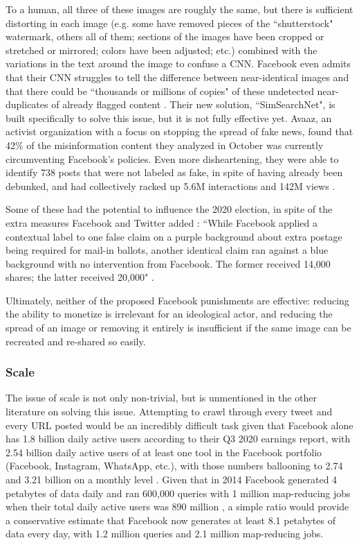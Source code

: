 \documentclass[preprint,review,12pt]{elsarticle}
\begin{document}
To a human, all three of these images are roughly the same, but there is sufficient distorting in each image (e.g. some have removed pieces of the ``shutterstock" watermark, others all of them; sections of the images have been cropped or stretched or mirrored; colors have been adjusted; etc.) combined with the variations in the text around the image to confuse a CNN. Facebook even admits that their CNN struggles to tell the difference between near-identical images and that there could be ``thousands or millions of copies" of these undetected near-duplicates of already flagged content \cite{sumbaly2020using}. Their new solution, ``SimSearchNet", is built specifically to solve this issue, but it is not fully effective yet. Avaaz, an activist organization with a focus on stopping the spread of fake news, found that 42\% of the misinformation content they analyzed in October was currently circumventing Facebook's policies. Even more disheartening, they were able to identify 738 posts that were not labeled as fake, in spite of having already been debunked, and had collectively racked up 5.6M interactions and 142M views \cite{schott2020brief}.

Some of these had the potential to influence the 2020 election, in spite of the extra measures Facebook and Twitter added \cite{dean2020facebook}: ``While Facebook applied a contextual label to one false claim on a purple background about extra postage being required for mail-in ballots, another identical claim ran against a blue background with no intervention from Facebook. The former received 14,000 shares; the latter received 20,000" \cite{Fung2020facebook}.

Ultimately, neither of the proposed Facebook punishments are effective: reducing the ability to monetize is irrelevant for an ideological actor, and reducing the spread of an image or removing it entirely is insufficient if the same image can be recreated and re-shared so easily.

\subsubsection{Scale}
\label{Scale Section}
The issue of scale is not only non-trivial, but is unmentioned in the other literature on solving this issue. Attempting to crawl through every tweet and every URL posted would be an incredibly difficult task given that Facebook alone has 1.8 billion daily active users according to their Q3 2020 earnings report, with 2.54 billion daily active users of at least one tool in the Facebook portfolio (Facebook, Instagram, WhatsApp, etc.), with those numbers ballooning to 2.74 and 3.21 billion on a monthly level \cite{facebook2020q3}. Given that in 2014 Facebook generated 4 petabytes of data daily and ran 600,000 queries with 1 million map-reducing jobs when their total daily active users was 890 million \cite{bronson2015open}, a simple ratio would provide a conservative estimate that Facebook now generates at least 8.1 petabytes of data every day, with 1.2 million queries and 2.1 million map-reducing jobs. 
\end{document}
